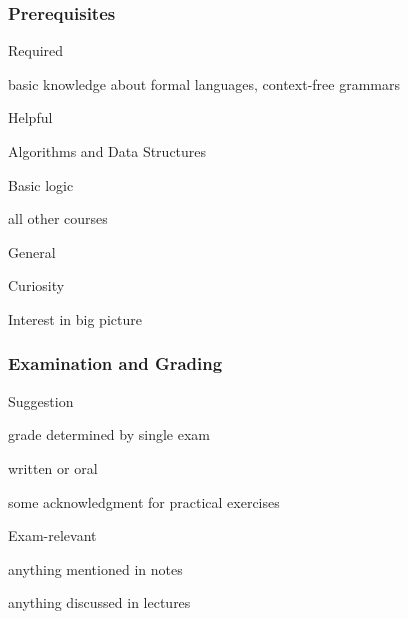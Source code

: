 \begin{frame}\frametitle{Prerequisites}
\begin{blockitems}{Required}
\item basic knowledge about formal languages, context-free grammars
\end{blockitems}

\begin{blockitems}{Helpful}
\item Algorithms and Data Structures
\item Basic logic
\item all other courses
\end{blockitems}

\begin{blockitems}{General}
\item Curiosity 
\item Interest in big picture 
\end{blockitems}
\end{frame}

\begin{frame}\frametitle{Examination and Grading}
\begin{blockitems}{Suggestion}
\item grade determined by single exam
\item written or oral 
\item some acknowledgment for practical exercises
\end{blockitems}

\begin{blockitems}{Exam-relevant}
\item anything mentioned in notes
\item anything discussed in lectures
\end{blockitems}
\end{frame}

